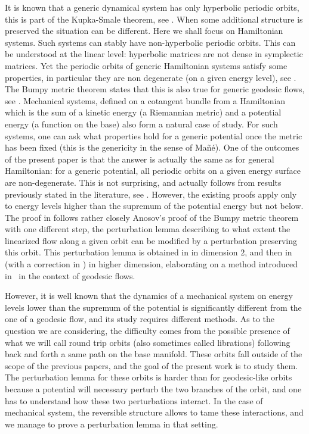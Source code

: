 \documentclass[JEP,XML,SOM,Unicode,published]{cedram}
\theoremstyle{plain}
\theoremstyle{definition}
\begin{document}
It is known that a generic dynamical system has only hyperbolic periodic orbits, this is part of the Kupka-Smale theorem, see
\cite{K63,S63}. When some additional structure is preserved the situation can be different. Here we shall focus on Hamiltonian systems.
Such systems can stably have non-hyperbolic periodic orbits.
This can be understood at the linear level: hyperbolic matrices are not dense in symplectic matrices.
Yet the periodic orbits of generic Hamiltonian systems satisfy some properties, in particular they are non degenerate (on a given energy level), see \cite{CR1,CR2}. The Bumpy metric theorem states that this is also true for generic geodesic flows, see \cite{A68,A82}.
Mechanical systems, defined on a cotangent bundle from a Hamiltonian
which is the sum of a kinetic energy (a Riemannian metric) and a potential energy (a function on the base)
also form a natural case of study.
For such systems, one can ask what properties hold for a generic potential once the metric has been fixed
(this is the genericity in the sense of Mañé).
One of the outcomes of the present paper is that the answer is actually the same as for general Hamiltonian: for a generic potential, all periodic orbits on a given energy surface are non-degenerate.
This is not surprising, and actually follows from results previously stated in the literature, see \cite{O08,RR}.
However, the existing proofs apply only to energy levels higher than the supremum of the potential energy but not below.
The proof in \cite{O08} follows rather closely Anosov's proof of the Bumpy metric theorem
with one different step, the perturbation lemma describing to what extent the linearized flow along a given orbit can be modified by a perturbation preserving this orbit. This perturbation lemma is obtained in \cite{O08} in dimension $2$, and then in \cite{RR}
(with a correction in \cite{AB}) in higher dimension, elaborating on
a method introduced in~\cite{Co10} in the context of geodesic flows.

However, it is well known that the dynamics of a mechanical system on energy levels lower than the supremum of the potential is
significantly different from the one of a geodesic flow, and its study requires different methods. As to the question we are considering, the difficulty comes from the possible presence of what we will call round trip orbits (also sometimes called librations)
following back and forth a same path on the base manifold.
These orbits fall outside of the scope of the previous papers,
and the goal of the present work is to study them.
The perturbation lemma for these orbits is harder than for geodesic-like orbits because
a potential will necessary perturb the two branches of the orbit, and one has to understand how these two perturbations interact.
In the case of mechanical system, the reversible structure allows to tame these interactions, and we manage to prove a perturbation lemma in that setting.
\end{document}
